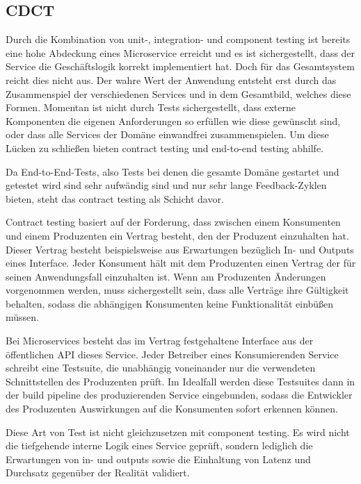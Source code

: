 \documentclass[12pt,a4paper,bibliography=totocnumbered,listof=totocnumbered]{scrartcl}
\begin{document}
\subsection{\acf{CDCT}}

Durch die Kombination von unit-, integration- und component testing ist bereits eine hohe Abdeckung eines Microservice erreicht und es ist sichergestellt, dass der Service die Geschäftslogik korrekt implementiert hat. Doch für das Gesamtsystem reicht dies nicht aus. Der wahre Wert der Anwendung entsteht erst durch das Zusammenspiel der verschiedenen Services und in dem Gesamtbild, welches diese Formen. Momentan ist nicht durch Tests sichergestellt, dass externe Komponenten die eigenen Anforderungen so erfüllen wie diese gewünscht sind, oder dass alle Services der Domäne einwandfrei zusammenspielen.\cite{clemson} Um diese Lücken zu schließen bieten contract testing und end-to-end testing abhilfe.

Da End-to-End-Tests, also Tests bei denen die gesamte Domäne gestartet und getestet wird sind sehr aufwändig sind und nur sehr lange Feedback-Zyklen bieten, steht das contract testing als Schicht davor.\cite{clemson}

Contract testing basiert auf der Forderung, dass zwischen einem Konsumenten und einem Produzenten ein Vertrag besteht, den der Produzent einzuhalten hat. Dieser Vertrag besteht beispielsweise aus Erwartungen bezüglich In- und Outputs eines Interface. Jeder Konsument hält mit dem Produzenten einen Vertrag der für seinen Anwendungsfall einzuhalten ist. Wenn am Produzenten Änderungen vorgenommen werden, muss sichergestellt sein, dass alle Verträge ihre Gültigkeit behalten, sodass die abhängigen Konsumenten keine Funktionalität einbüßen müssen.\cite{clemson}

Bei Microservices besteht das im Vertrag festgehaltene Interface aus der öffentlichen \ac{API} dieses Service. Jeder Betreiber eines Konsumierenden Service schreibt eine Testsuite, die unabhängig voneinander nur die verwendeten Schnittstellen des Produzenten prüft. Im Idealfall werden diese Testsuites dann in der build pipeline des produzierenden Service eingebunden, sodass die Entwickler des Produzenten Auswirkungen auf die Konsumenten sofort erkennen können.\cite{clemson}

Diese Art von Test ist nicht gleichzusetzen mit component testing. Es wird nicht die tiefgehende interne Logik eines Service geprüft, sondern lediglich die Erwartungen von in- und outputs sowie die Einhaltung von Latenz und Durchsatz gegenüber der Realität validiert.\cite{clemson}
\end{document}
